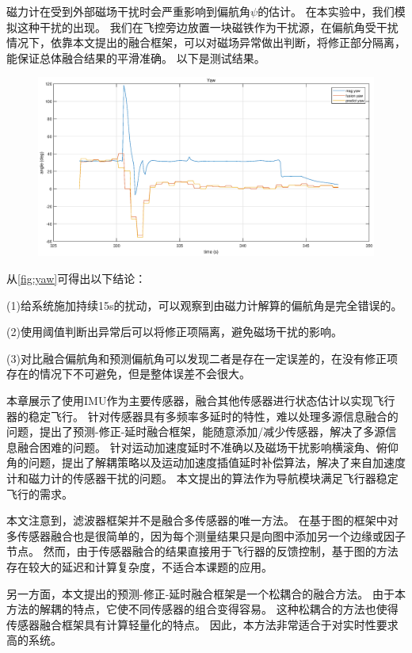 \documentclass[
  type=master
]{gdutthesis}
\begin{document}
磁力计在受到外部磁场干扰时会严重影响到偏航角$\psi$的估计。
在本实验中，我们模拟这种干扰的出现。
我们在飞控旁边放置一块磁铁作为干扰源，在偏航角受干扰情况下，依靠本文提出的融合框架，可以对磁场异常做出判断，将修正部分隔离，能保证总体融合结果的平滑准确。
以下是测试结果。
\begin{figure}[H]
	\centering
	\includegraphics[width=1.0\textwidth]{yaw.eps}
	\label{fig:yaw}
\end{figure}

从\autoref{fig:yaw}可得出以下结论：

(1)给系统施加持续15s的扰动，可以观察到由磁力计解算的偏航角是完全错误的。

(2)使用阈值判断出异常后可以将修正项隔离，避免磁场干扰的影响。

(3)对比融合偏航角和预测偏航角可以发现二者是存在一定误差的，在没有修正项存在的情况下不可避免，但是整体误差不会很大。

本章展示了使用IMU作为主要传感器，融合其他传感器进行状态估计以实现飞行器的稳定飞行。
针对传感器具有多频率多延时的特性，难以处理多源信息融合的问题，提出了预测-修正-延时融合框架，能随意添加/减少传感器，解决了多源信息融合困难的问题。
针对运动加速度延时不准确以及磁场干扰影响横滚角、俯仰角的问题，提出了解耦策略以及运动加速度插值延时补偿算法，解决了来自加速度计和磁力计的传感器干扰的问题。
本文提出的算法作为导航模块满足飞行器稳定飞行的需求。

本文注意到，滤波器框架并不是融合多传感器的唯一方法。
在基于图的框架中对多传感器融合也是很简单的，因为每个测量结果只是向图中添加另一个边缘或因子节点\cite{schleicher2009real}。
然而，由于传感器融合的结果直接用于飞行器的反馈控制，基于图的方法存在较大的延迟和计算复杂度，不适合本课题的应用。

另一方面，本文提出的预测-修正-延时融合框架是一个松耦合的融合方法。
由于本方法的解耦的特点，它使不同传感器的组合变得容易。
这种松耦合的方法也使得传感器融合框架具有计算轻量化的特点。
因此，本方法非常适合于对实时性要求高的系统。
\end{document}
